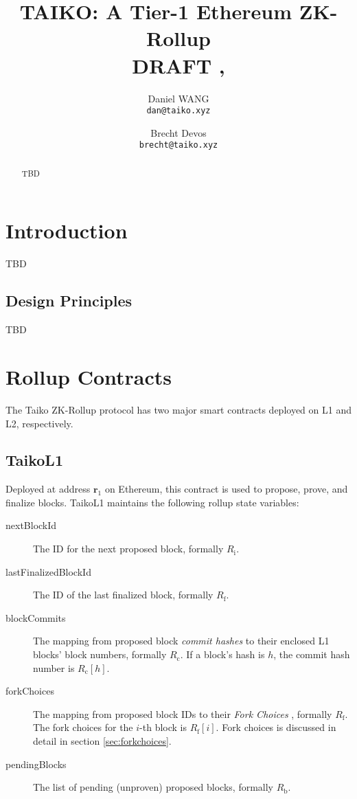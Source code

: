 \documentclass[9pt,oneside]{amsart}
\title[TAIKO: A Tier-1 Ethereum ZK-Rollup\\ \smaller \textbf{{DRAFT \VersionNumber}}]{TAIKO: A Tier-1 Ethereum ZK-Rollup \\ \smaller \textbf{{DRAFT \VersionNumber, \thedate}}}
\author{
  Daniel WANG\\
  \texttt{dan@taiko.xyz}
  \and
  Brecht Devos\\
  \texttt{brecht@taiko.xyz}
}
\begin{document}
\pagecolor{pagecolor}

\begin{abstract}
TBD
\end{abstract}

\maketitle

\setlength{\columnsep}{20pt}
\begin{multicols}{2}


\section{Introduction}

TBD

\subsection{Design Principles}

TBD

\section{Rollup Contracts}
The Taiko ZK-Rollup protocol has two major smart contracts deployed on L1 and L2, respectively.

\subsection{TaikoL1} Deployed at address $\mathbf{r_{\mathrm{1}}}$ on Ethereum, this contract is used to propose, prove, and finalize blocks. TaikoL1  maintains the following rollup state variables:

\begin{description}
\item[nextBlockId] The ID for the next proposed block, formally $R_\mathrm{i}$.
\item[lastFinalizedBlockId] The ID of the last finalized block, formally $R_\mathrm{f}$.
\item [blockCommits] The mapping from proposed block \textit{commit hashes} to their enclosed L1 blocks' block numbers, formally $R_\mathrm{c}$. If a block's hash is $h$, the commit hash number is $R_\mathrm{c}[h]$.
\item[forkChoices] The mapping from proposed block IDs to their \textit{Fork Choices} , formally $R_\mathrm{f}$. The fork choices for the $i$-th block is $R_\mathrm{f}[i]$. Fork choices is discussed in detail in section \ref{sec:forkchoices}.
\item[pendingBlocks] The list of pending (unproven) proposed blocks, formally $R_\mathrm{b}$.
\end{description}




\end{multicols}
\end{document}
